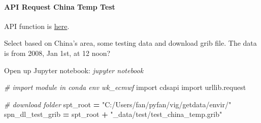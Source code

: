 \documentclass[
]{book}
\newenvironment{Shaded}{\begin{snugshade}}{\end{snugshade}}
\newcommand{\CommentTok}[1]{\textcolor[rgb]{0.56,0.35,0.01}{\textit{#1}}}
\newcommand{\ImportTok}[1]{#1}
\newcommand{\NormalTok}[1]{#1}
\newcommand{\OperatorTok}[1]{\textcolor[rgb]{0.81,0.36,0.00}{\textbf{#1}}}
\newcommand{\StringTok}[1]{\textcolor[rgb]{0.31,0.60,0.02}{#1}}
\begin{document}
\hypertarget{api-request-china-temp-test}{%
\paragraph{API Request China Temp Test}\label{api-request-china-temp-test}}

API function is \href{https://github.com/ecmwf/cdsapi/blob/master/cdsapi/api.py}{here}.

Select based on China's area, some testing data and download grib file. The data is from 2008, Jan 1st, at 12 noon?

Open up Jupyter notebook: \emph{jupyter notebook}

\begin{Shaded}
\begin{Highlighting}[]
\CommentTok{\# import module in conda env wk\_ecmwf}
\ImportTok{import}\NormalTok{ cdsapi }
\ImportTok{import}\NormalTok{ urllib.request}

\CommentTok{\# download folder}
\NormalTok{spt\_root }\OperatorTok{=} \StringTok{"C:/Users/fan/pyfan/vig/getdata/envir/"}
\NormalTok{spn\_dl\_test\_grib }\OperatorTok{=}\NormalTok{ spt\_root }\OperatorTok{+} \StringTok{"\_data/test/test\_china\_temp.grib"}


\end{Highlighting}
\end{Shaded}
\end{document}
